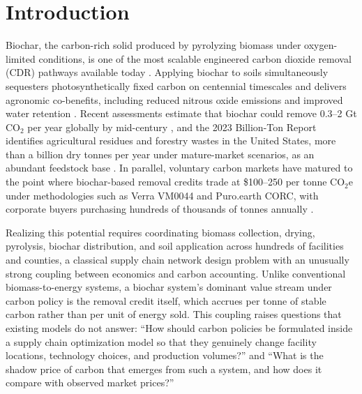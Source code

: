 
\section{Introduction}

Biochar, the carbon-rich solid produced by pyrolyzing biomass under oxygen-limited
conditions, is one of the most scalable engineered carbon dioxide removal (CDR)
pathways available today \cite{woolf2010, lehmann2021biochar}. Applying biochar to
soils simultaneously sequesters photosynthetically fixed carbon on centennial
timescales and delivers agronomic co-benefits, including reduced nitrous oxide
emissions and improved water retention \cite{cayuela2014, smith2016}. Recent
assessments estimate that biochar could remove 0.3--2 Gt CO$_2$ per year globally
by mid-century \cite{woolf2021est}, and the 2023 Billion-Ton Report identifies
agricultural residues and forestry wastes in the United States, more than a
billion dry tonnes per year under mature-market scenarios, as an abundant
feedstock base \cite{bt23}. In parallel, voluntary carbon markets have matured to
the point where biochar-based removal credits trade at \$100--250 per tonne
CO$_2$e under methodologies such as Verra VM0044 and Puro.earth CORC, with
corporate buyers purchasing hundreds of thousands of tonnes annually
\cite{cdrfyi2024, verraVM0044}.

Realizing this potential requires coordinating biomass collection, drying,
pyrolysis, biochar distribution, and soil application across hundreds of
facilities and counties, a classical supply chain network design problem with an
unusually strong coupling between economics and carbon accounting. Unlike
conventional biomass-to-energy systems, a biochar system's dominant value stream
under carbon policy is the removal credit itself, which accrues per tonne of
stable carbon rather than per unit of energy sold. This coupling raises
questions that existing models do not answer: ``How should carbon policies be
formulated inside a supply chain optimization model so that they genuinely
change facility locations, technology choices, and production volumes?'' and
``What is the shadow price of carbon that emerges from such a system, and
how does it compare with observed market prices?''

